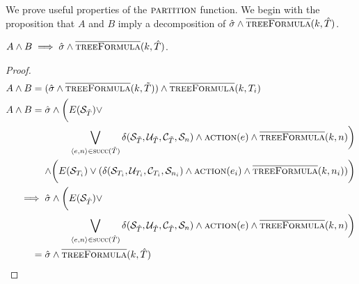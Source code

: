 We prove useful properties of the $\textsc{partition}$ function. We begin with the proposition that $A$ and $B$ imply a decomposition of $\hat{\sigma} \land \textsc{$\overline{\mbox{treeFormula}}$}(k, \hat{T})$. 
\begin{proposition}\label{prop:aandb}
    $A\land B \implies \hat{\sigma} \land \textsc{$\overline{\mbox{treeFormula}}$}(k, \hat{T})$.
\end{proposition}
\begin{proof}
    \begin{align*}
        A \land B ={}& (\hat{\sigma} \land \opptf(k, \tilde{T})) \land \opptf(k, T_i) \\
        A \land B ={}& \hat{\sigma} \land \bigg( E({\mathcal{S}_{\tilde{T}})} \lor \\
                     & \pushright{ \bigvee_{\langle e, n \rangle \in \textsc{succ}(\tilde{T})} \delta({\mathcal{S}_{\tilde{T}}}, {\mathcal{U}_{\tilde{T}}}, {\mathcal{C}_{\tilde{T}}}, {\mathcal{S}_n}) \land \textsc{action}(e) \land \opptf(k, n) \bigg)} \\
                     & \pushright{\land \bigg( E({\mathcal{S}_{T_i}}) \lor (\delta({\mathcal{S}_{T_i}}, {\mathcal{U}_{T_i}}, {\mathcal{C}_{T_i}}, {\mathcal{S}_{n_i}}) \land \textsc{action}(e_i) \land \opptf(k, n_i)) \bigg)} \\
        \implies{}& \hat{\sigma} \land \bigg( E({\mathcal{S}_{\hat{T}}}) \lor \\
                  & \pushright{  \bigvee_{\langle e, n \rangle \in \textsc{succ}(\hat{T})} \delta({\mathcal{S}_{\hat{T}}}, {\mathcal{U}_{\hat{T}}}, {\mathcal{C}_{\hat{T}}}, {\mathcal{S}_n}) \land \textsc{action}(e) \land \opptf(k, n) \bigg)} \\
        ={}& \hat{\sigma} \land \opptf(k, \hat{T})
    \end{align*}
\end{proof}

